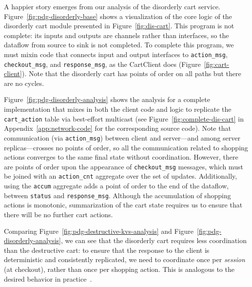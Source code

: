 A happier story emerges from our analysis of the disorderly cart service.
Figure~\ref{fig:pdg-disorderly-base} shows a visualization of the core logic of
the disorderly cart module presented in Figure~\ref{fig:dis-cart}.  This program
is not complete: its inputs and outputs are channels rather than interfaces, so
the dataflow from source to sink is not completed.  To complete this program, we
must mixin code that connects input and output interfaces to
\texttt{action\_msg}, \texttt{checkout\_msg}, and \texttt{response\_msg}, as the
CartClient does (Figure~\ref{fig:cart-client}).  Note that the disorderly cart
has points of order on all paths but there are no cycles.

Figure~\ref{fig:pdg-disorderly-analysis} shows the analysis for a complete
implementation that mixes in both the client code and logic to replicate the
\texttt{cart\_action} table via best-effort multicast (see
Figure~\ref{fig:complete-dis-cart} in Appendix~\ref{app:network-code} for the
corresponding source code).  Note that communication (via \texttt{action\_msg})
between client and server---and among server replicas---crosses no points of
order, so all the communication related to shopping actions converges to the
same final state without coordination.  However, there are points of order upon
the appearance of \texttt{checkout\_msg} messages, which must be joined with an
\texttt{action\_cnt} aggregate over the set of updates.  Additionally, using the
\texttt{accum} aggregate adds a point of order to the end of the dataflow,
between \texttt{status} and \texttt{response\_msg}.  Although the accumulation
of shopping actions is monotonic, summarization of the cart state requires us to
ensure that there will be no further cart actions.

Comparing Figure~\ref{fig:pdg-destructive-kvs-analysis} and
Figure~\ref{fig:pdg-disorderly-analysis}, we can see that the disorderly cart
requires less coordination than the destructive cart: to ensure that the
response to the client is deterministic and consistently replicated, we need to
coordinate once per {\em session} (at checkout), rather than once per shopping
action.  This is analogous to the desired behavior in practice~\cite{quicksand}.
%

